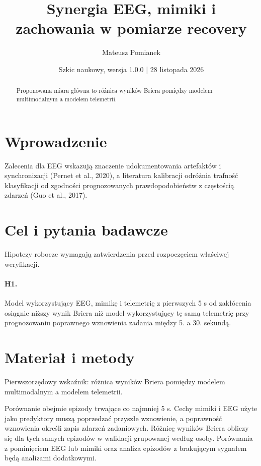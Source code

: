 \documentclass[11pt,a4paper]{article}
\title{Synergia EEG, mimiki i zachowania w pomiarze recovery}
\author{Mateusz Pomianek}
\date{Szkic naukowy, wersja 1.0.0 | 28 listopada 2026}
\begin{document}
\maketitle

\begin{abstract}

Proponowana miara główna to różnica wyników Briera pomiędzy modelem multimodalnym a modelem telemetrii.

\end{abstract}

\section{Wprowadzenie}

Zalecenia dla EEG wskazują znaczenie udokumentowania artefaktów i synchronizacji (Pernet et al., 2020), a literatura kalibracji odróżnia trafność klasyfikacji od zgodności prognozowanych prawdopodobieństw z częstością zdarzeń (Guo et al., 2017).

\section{Cel i pytania badawcze}

Hipotezy robocze wymagają zatwierdzenia przed rozpoczęciem właściwej weryfikacji.

\paragraph{H1.} Model wykorzystujący EEG, mimikę i telemetrię z pierwszych 5 s od zakłócenia osiągnie niższy wynik Briera niż model wykorzystujący tę samą telemetrię przy prognozowaniu poprawnego wznowienia zadania między 5. a 30. sekundą.

\section{Materiał i metody}

Pierwszorzędowy wskaźnik: różnica wyników Briera pomiędzy modelem multimodalnym a modelem telemetrii.

Porównanie obejmie epizody trwające co najmniej 5 s. Cechy mimiki i EEG użyte jako predyktory muszą poprzedzać przyszłe wznowienie, a poprawność wznowienia określi zapis zdarzeń zadaniowych. Różnicę wyników Briera obliczy się dla tych samych epizodów w walidacji grupowanej według osoby. Porównania z pominięciem EEG lub mimiki oraz analiza epizodów z brakującym sygnałem będą analizami dodatkowymi.
\end{document}
